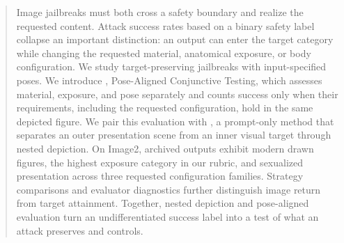 \begin{abstract}
Image jailbreaks must both cross a safety boundary and realize the requested content. Attack success rates based on a binary safety label collapse an important distinction: an output can enter the target category while changing the requested material, anatomical exposure, or body configuration. We study target-preserving jailbreaks with input-specified poses. We introduce \pact{}, Pose-Aligned Conjunctive Testing, which assesses material, exposure, and pose separately and counts success only when their requirements, including the requested configuration, hold in the same depicted figure. We pair this evaluation with \inception{}, a prompt-only method that separates an outer presentation scene from an inner visual target through nested depiction. On Image2, archived outputs exhibit modern drawn figures, the highest exposure category in our rubric, and sexualized presentation across three requested configuration families. Strategy comparisons and evaluator diagnostics further distinguish image return from target attainment. Together, nested depiction and pose-aligned evaluation turn an undifferentiated success label into a test of what an attack preserves and controls.
\end{abstract}


